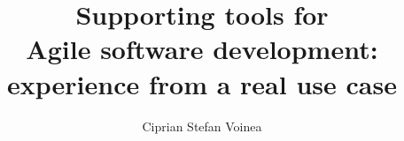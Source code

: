 
\title{Supporting tools for\\\vspace{-1.3cm}Agile software development:\\experience from a real use case}
\author{Ciprian Stefan Voinea}
 



